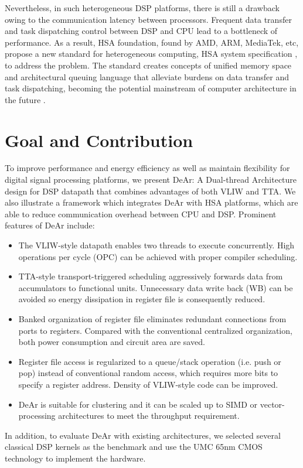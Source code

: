         Nevertheless, in such heterogeneous DSP platforms, there is still a drawback owing to the communication latency between processors. 
        Frequent data transfer and task dispatching control between DSP and CPU lead to a  bottleneck of performance. 
        As a result, HSA foundation, found by AMD, ARM, MediaTek, etc, propose a new standard for heterogeneous computing, HSA system specification \cite{systemspec}, to address the problem. 
        The standard creates concepts of unified memory space and architectural queuing language that alleviate burdens on data transfer and task dispatching, becoming the potential mainstream of computer architecture in the future \cite{mainstream}.

    \section{Goal and Contribution}
        To improve performance and energy efficiency as well as maintain flexibility for digital signal processing platforms, 
        we present DeAr: A Dual-thread Architecture design for DSP datapath that combines advantages of both VLIW and TTA.
        We also illustrate a framework which integrates DeAr with HSA platforms, which are able to reduce communication overhead between CPU and DSP. 
        Prominent features of DeAr include:
        \begin{itemize}
            \item The VLIW-style datapath enables two threads to execute concurrently. High operations per cycle (OPC) can be achieved with proper compiler scheduling.
            \item TTA-style transport-triggered scheduling aggressively forwards data from accumulators to functional units. Unnecessary data write back (WB) can be avoided so energy dissipation in register file is consequently reduced.
            \item Banked organization of register file eliminates redundant connections from ports to registers. Compared with the conventional centralized organization, both power consumption and circuit area are saved.
            \item Register file access is regularized to a queue/stack operation (i.e. push or pop) instead of conventional random access, which requires more bits to specify a register address. Density of VLIW-style code can be improved.
            \item DeAr is suitable for clustering and it can be scaled up to SIMD or vector-processing architectures to meet the throughput requirement.
        \end{itemize}
        In addition, to evaluate DeAr with existing architectures, we selected several classical DSP kernels \cite{dspstone} \cite{bdti} as the benchmark and use the UMC 65nm CMOS technology to implement the hardware.

